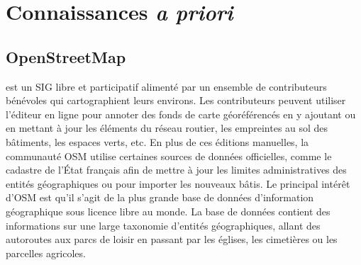 

\section{Connaissances \textit{a priori}}

\subsection{OpenStreetMap}

 est un \gls{SIG} libre et participatif alimenté par un ensemble de contributeurs bénévoles qui cartographient leurs environs. Les contributeurs peuvent utiliser l'éditeur en ligne pour annoter des fonds de carte géoréférencés en y ajoutant ou en mettant à jour les éléments du réseau routier, les empreintes au sol des bâtiments, les espaces verts, etc. En plus de ces éditions manuelles, la communauté \gls{OSM} utilise certaines sources de données officielles, comme le cadastre de l'État français afin de mettre à jour les limites administratives des entités géographiques ou pour importer les nouveaux bâtis. Le principal intérêt d'\gls{OSM} est qu'il s'agit de la plus grande base de données d'information géographique sous licence libre au monde. La base de données contient des informations sur une large taxonomie d'entités géographiques, allant des autoroutes aux parcs de loisir en passant par les églises, les cimetières ou les parcelles agricoles.

